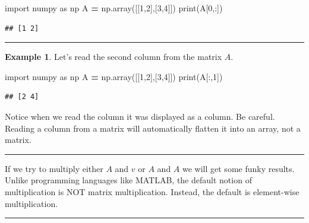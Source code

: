\documentclass[
]{book}
\newenvironment{Shaded}{\begin{snugshade}}{\end{snugshade}}
\newcommand{\BuiltInTok}[1]{#1}
\newcommand{\DecValTok}[1]{\textcolor[rgb]{0.00,0.00,0.81}{#1}}
\newcommand{\ImportTok}[1]{#1}
\newcommand{\NormalTok}[1]{#1}
\newcommand{\OperatorTok}[1]{\textcolor[rgb]{0.81,0.36,0.00}{\textbf{#1}}}
\theoremstyle{definition}
\theoremstyle{definition}
\newtheorem{example}{Example}[chapter]
\theoremstyle{definition}
\theoremstyle{remark}
\begin{document}
\begin{Shaded}
\begin{Highlighting}[]
\ImportTok{import}\NormalTok{ numpy }\ImportTok{as}\NormalTok{ np}
\NormalTok{A }\OperatorTok{=}\NormalTok{ np.array([[}\DecValTok{1}\NormalTok{,}\DecValTok{2}\NormalTok{],[}\DecValTok{3}\NormalTok{,}\DecValTok{4}\NormalTok{]])}
\BuiltInTok{print}\NormalTok{(A[}\DecValTok{0}\NormalTok{,:])}
\end{Highlighting}
\end{Shaded}

\begin{verbatim}
## [1 2]
\end{verbatim}

\begin{center}\rule{0.5\linewidth}{0.5pt}\end{center}

\begin{example}
\protect\hypertarget{exm:unnamed-chunk-721}{}{\label{exm:unnamed-chunk-721} }Let's read the second column from the matrix \(A\).
\end{example}

\begin{Shaded}
\begin{Highlighting}[]
\ImportTok{import}\NormalTok{ numpy }\ImportTok{as}\NormalTok{ np}
\NormalTok{A }\OperatorTok{=}\NormalTok{ np.array([[}\DecValTok{1}\NormalTok{,}\DecValTok{2}\NormalTok{],[}\DecValTok{3}\NormalTok{,}\DecValTok{4}\NormalTok{]])}
\BuiltInTok{print}\NormalTok{(A[:,}\DecValTok{1}\NormalTok{])}
\end{Highlighting}
\end{Shaded}

\begin{verbatim}
## [2 4]
\end{verbatim}

Notice when we read the column it was displayed as a column. Be careful. Reading a column from a matrix will automatically flatten it into an array, not a matrix.

\begin{center}\rule{0.5\linewidth}{0.5pt}\end{center}

If we try to multiply either \(A\) and \(v\) or \(A\) and \(A\) we will get some funky results. Unlike programming languages like MATLAB, the default notion of multiplication is NOT matrix multiplication. Instead, the default is element-wise multiplication.

\begin{center}\rule{0.5\linewidth}{0.5pt}\end{center}
\end{document}

